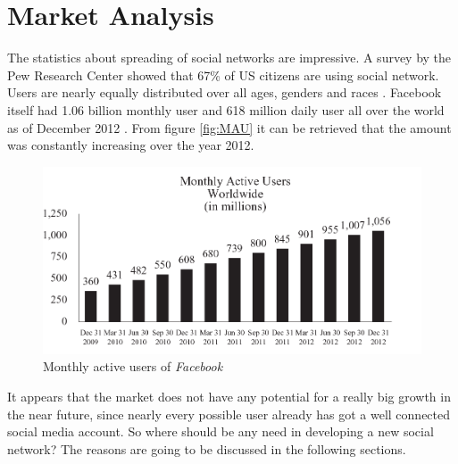 \documentclass[11pt,a4paper]{report}
\begin{document}
\chapter{Market Analysis}

The statistics about spreading of social networks are impressive. A survey by the Pew Research Center showed that 67\% of US citizens are using social network. Users are nearly equally distributed over all ages, genders and races \cite{PewResearch}. Facebook itself had 1.06 billion monthly user and 618 million daily user all over the world as of December 2012 \cite{FBReport}. From figure \vref{fig:MAU} it can be retrieved that the amount was constantly increasing over the year 2012. 
\begin{figure}[h]
    \centering
      \includegraphics{./Pictures/MAU_FB.png}
      \caption[Monthly active users of \emph{Facebook} retrieved from \cite{FBReport}]{Monthly active users of \emph{Facebook}}
      \label{fig:MAU}
\end{figure}
It appears that the market does not have any potential for a really big growth in the near future, since nearly every possible user already has got a well connected social media account. So where should be any need in developing a new social network? The reasons are going to be discussed in the following sections.
\end{document}
